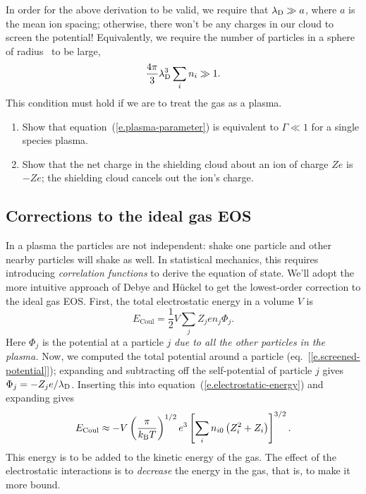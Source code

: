 In order for the above derivation to be valid, we require that $\lambda_{\mathrm{D}} \gg a$, where $a$ is the mean ion spacing; otherwise, there won't be any charges in our cloud to screen the potential! Equivalently, we require the number of particles in a sphere of radius \lambdaD\ to be large,
\begin{equation}\label{e.plasma-parameter}
\frac{4\pi}{3}\lambda_{\mathrm{D}}^{3} \sum_{i} n_{i} \gg 1.
\end{equation}
This condition must hold if we are to treat the gas as a plasma.
\newpage
\begin{exercisebox}
\begin{enumerate}
\item Show that equation~(\ref{e.plasma-parameter}) is equivalent to $\Gamma \ll 1$ for a single species plasma.
\item Show that the net charge in the shielding cloud about an ion of charge $Ze$ is $-Ze$; the shielding cloud cancels out the ion's charge.
\end{enumerate}
\end{exercisebox}

\subsection{Corrections to the ideal gas EOS}\label{s.plasma-corrections}

In a plasma the particles are not independent: shake one particle and other nearby particles will shake as well. In statistical mechanics, this requires introducing \emph{correlation functions} to derive the equation of state.  We'll adopt the more intuitive approach of Debye and H\"uckel to get the lowest-order correction to the ideal gas EOS.  First, the total electrostatic energy in a volume $V$ is
\begin{equation}\label{e.electrostatic-energy}
E_{\mathrm{Coul}} = \frac{1}{2}V\sum_{j}Z_{j}e n_{j}\Phi_{j}.
\end{equation}
Here $\Phi_{j}$ is the potential at a particle $j$ \emph{due to all the other particles in the plasma.}  Now, we computed the total potential around a particle (eq.~[\ref{e.screened-potential}]); expanding and subtracting off the self-potential of particle $j$ gives $\Phi_{j} = -Z_{j}e/\lambda_{\mathrm{D}}$.  Inserting this into equation~(\ref{e.electrostatic-energy}) and expanding gives
\begin{equation}\label{e.electrostatic-energy-2}
E_{\mathrm{Coul}} \approx - V\left(\frac{\pi}{k_\mathrm{B} T}\right)^{1/2} e^{3} \left[\sum_{i}n_{i0} \left(Z_{i}^{2} + Z_{i}\right)\right]^{3/2}.
\end{equation}
This energy is to be added to the kinetic energy of the gas.  The effect of the electrostatic interactions is to \emph{decrease} the energy in the gas, that is, to make it more bound.

